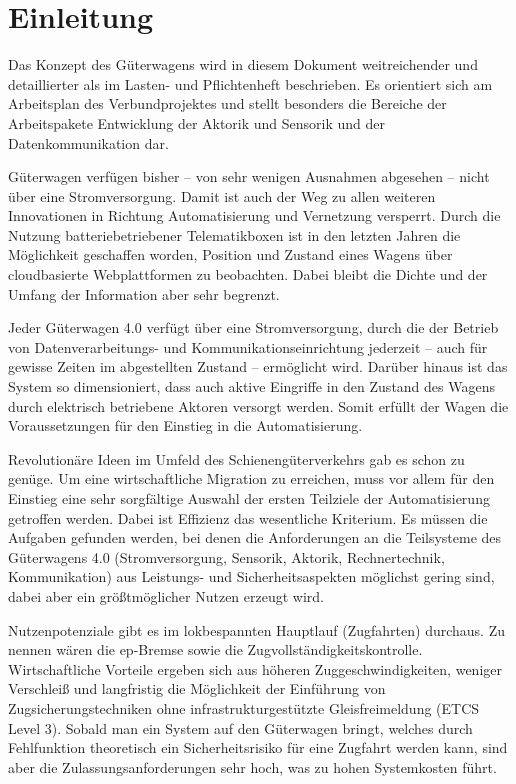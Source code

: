\section{Einleitung}
Das Konzept des Güterwagens wird in diesem Dokument weitreichender und detaillierter als im Lasten- und Pflichtenheft beschrieben. Es orientiert sich am Arbeitsplan des Verbundprojektes und stellt besonders die Bereiche der Arbeitspakete Entwicklung der Aktorik und Sensorik und der Datenkommunikation dar.\par

Güterwagen verfügen bisher -- von sehr wenigen Ausnahmen abgesehen -- nicht über eine Stromversorgung. Damit ist auch der Weg zu allen weiteren Innovationen in Richtung Automatisierung und Vernetzung versperrt. Durch die Nutzung batteriebetriebener Telematikboxen ist in  den letzten Jahren die Möglichkeit geschaffen worden, Position und Zustand eines Wagens über cloudbasierte Webplattformen zu beobachten. Dabei bleibt die Dichte und der Umfang der Information aber sehr begrenzt.

Jeder Güterwagen 4.0 verfügt über eine Stromversorgung, durch die der Betrieb von Datenverarbeitungs- und Kommunikationseinrichtung jederzeit -- auch für gewisse Zeiten im abgestellten Zustand -- ermöglicht wird. Darüber hinaus ist das System so dimensioniert, dass auch aktive Eingriffe in den Zustand des Wagens durch elektrisch betriebene Aktoren versorgt werden. Somit erfüllt der Wagen die Voraussetzungen für den Einstieg in die Automatisierung. 

Revolutionäre Ideen im Umfeld des Schienengüterverkehrs gab es schon zu genüge. Um eine wirtschaftliche Migration zu erreichen, muss vor allem für den Einstieg eine sehr sorgfältige Auswahl der ersten Teilziele der Automatisierung getroffen werden. Dabei ist Effizienz das wesentliche Kriterium. Es müssen die Aufgaben gefunden werden, bei denen die Anforderungen an die Teilsysteme des Güterwagens 4.0 (Stromversorgung, Sensorik, Aktorik, Rechnertechnik, Kommunikation) aus Leistungs- und Sicherheitsaspekten möglichst gering sind, dabei aber ein größtmöglicher Nutzen erzeugt wird. 

Nutzenpotenziale gibt es im lokbespannten Hauptlauf (Zugfahrten) durchaus. Zu nennen wären die ep-Bremse sowie die Zugvollständigkeitskontrolle. Wirtschaftliche Vorteile ergeben sich aus höheren Zuggeschwindigkeiten, weniger Verschleiß und langfristig die Möglichkeit der Einführung von Zugsicherungstechniken ohne infrastrukturgestützte Gleisfreimeldung (ETCS Level 3). Sobald man ein System auf den Güterwagen bringt, welches durch Fehlfunktion theoretisch ein Sicherheitsrisiko für eine Zugfahrt werden kann, sind aber die Zulassungsanforderungen sehr hoch, was zu hohen Systemkosten führt.

